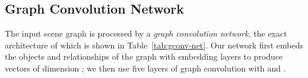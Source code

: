 \documentclass[10pt,twocolumn,letterpaper]{article}
\begin{document}
\begin{table}
  \centering
  \setlength{\tabcolsep}{1mm}
  \vspace{1mm}
  \caption{
    Network architecture for the second network  used in graph convolution;
    this network implements a symmetric pooling function to convert the set of
    all candidate vectors for an object into a single output vector.
  }
  \label{tab:gconv-h}
\end{table}

\subsection{Graph Convolution Network}
The input scene graph is processed by a \emph{graph convolution network}, the
exact architecture of which is shown in Table~\ref{tab:gconv-net}. Our network
first embeds the objects and relationships of the graph with embedding layers to
produce vectors of dimension ; we then use five layers of graph convolution
with  and .
\end{document}
